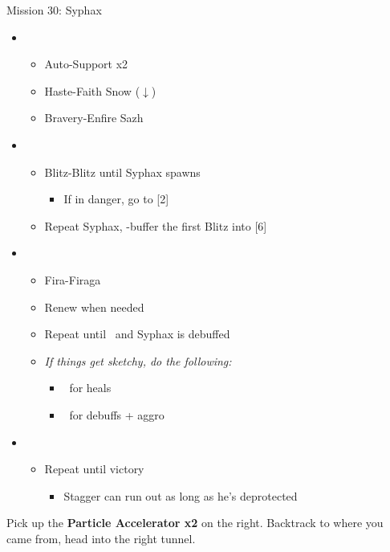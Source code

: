 \begin{battle}{Mission 30: Syphax}
	\begin{itemize}
		\item \third
			\begin{itemize}
				\item Auto-Support x2
				\item Haste-Faith Snow ($\downarrow$)
				\item Bravery-Enfire Sazh
			\end{itemize}
		\item \sixth
			\begin{itemize}
				\item Blitz-Blitz until Syphax spawns
					\begin{itemize}
						\item If in danger, go to [2]
					\end{itemize}
				\item Repeat Syphax, \rav-buffer the first Blitz into [6]
			\end{itemize}
		\item \fifth
			\begin{itemize}
				\item Fira-Firaga
				\item Renew when needed
				\item Repeat until \stagger~and Syphax is debuffed
				\item \textit{If things get sketchy, do the following:}
					\begin{itemize}
						\item \first~for heals
						\item \second~for debuffs + aggro
					\end{itemize}
			\end{itemize}
		\item \sixth
			\begin{itemize}
				\item Repeat until victory
					\begin{itemize}
						\item Stagger can run out as long as he's deprotected
					\end{itemize}
			\end{itemize}
	\end{itemize}
\end{battle}

Pick up the \textbf{Particle Accelerator x2} on the right.
Backtrack to where you came from, head into the right tunnel.


